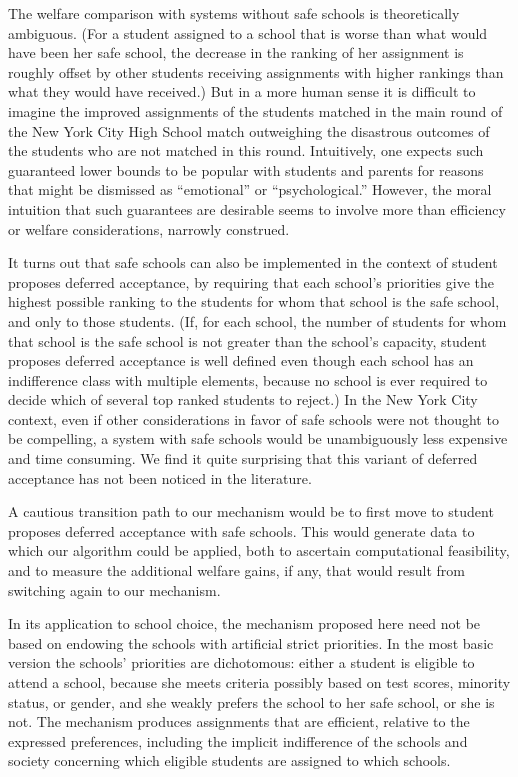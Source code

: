\documentclass[12pt]{article}
\theoremstyle{definition}
\begin{document}
The welfare comparison with systems without safe schools is theoretically ambiguous. (For a student assigned to a school that is worse than what would have been her safe school, the decrease in the ranking of her assignment is roughly offset by other students receiving assignments with higher rankings than what they would have received.) But in a more human sense it is difficult to imagine the improved assignments of the students matched in the main round of  the New York City High School match outweighing the disastrous outcomes of the students who are not matched in this round.   Intuitively, one expects such guaranteed lower bounds to be popular with students and parents for reasons that might be dismissed as ``emotional'' or ``psychological.'' 
However, the moral intuition that such guarantees are desirable seems to involve more than efficiency or welfare considerations, narrowly construed.

It turns out that safe schools can also be implemented in the context of student proposes deferred acceptance, by requiring that each school's priorities give the highest possible ranking to the students for whom that school is the safe school, and only to those students.  (If, for each school, the number of students for whom that school is the safe school is not greater than the school's capacity, student proposes deferred acceptance is well defined even though each school has an indifference class with multiple elements, because no school is ever required to decide which of several top ranked students to reject.)  In the New York City context, even if  other considerations in favor of safe schools were not thought to be compelling, a system with safe schools would be unambiguously less expensive and time consuming.  We find it quite surprising that this variant of deferred acceptance has not been noticed in the literature.

A cautious transition path to our mechanism would be to first move to student proposes deferred acceptance with safe schools.  This would generate data to which our algorithm could be applied, both to ascertain computational feasibility, and to measure the additional welfare gains, if any, that would result from switching again to our mechanism.

In its application to school choice, the mechanism proposed here need not be based on endowing the schools with artificial strict priorities.  In the most basic version the schools' priorities are dichotomous: either a student is eligible to attend a school, because she meets criteria possibly based on test scores, minority status, or gender, and she weakly prefers the school to her safe school, or she is not.  The mechanism produces assignments that are efficient, relative to the expressed preferences, including the implicit indifference of the schools and society concerning which eligible students are assigned to which schools.
\end{document}
